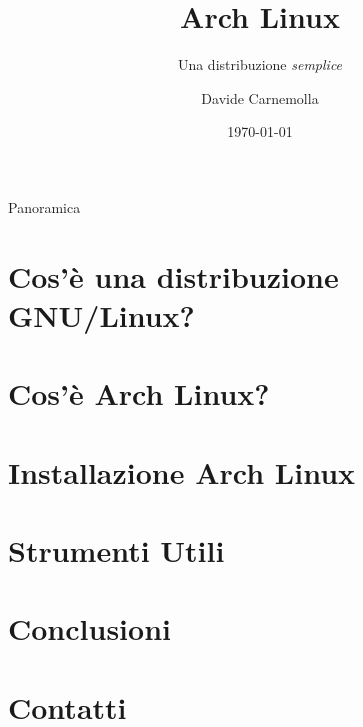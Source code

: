 \documentclass[aspectratio=169,xcolor=dvipsnames]{beamer}
\title{Arch Linux}
\subtitle{Una distribuzione \emph{semplice}}
\author {Davide Carnemolla}
\institute %
{
    Dipartimento di Matematica e Informatica \\
    Università degli Studi di Catania
    \vskip 3pt
}
\date{\today} %
\begin{document}
\begin{frame}
    \titlepage
\end{frame}

\begin{frame}{Panoramica}
    \tableofcontents
\end{frame}

\section{Cos'è una distribuzione GNU/Linux?}


\section{Cos'è Arch Linux?}


\section{Installazione Arch Linux}


\section{Strumenti Utili}


\section{Conclusioni}


\section{Contatti}


\end{document}
